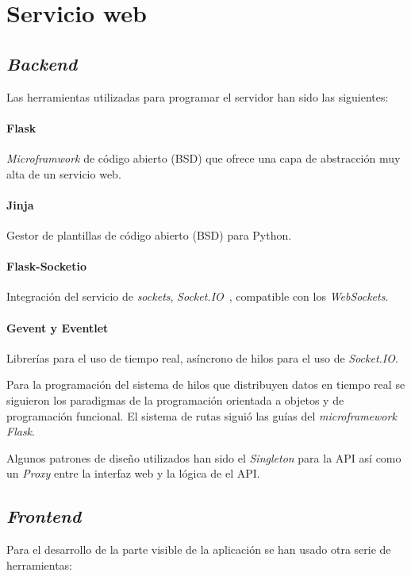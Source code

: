 \section{Servicio web}

\subsection{\textit{Backend}}

Las herramientas utilizadas para programar el servidor han sido las siguientes:
\paragraph{Flask~\cite{tool:flask}}\textit{Microframwork} de código abierto (BSD) que ofrece una capa de abstracción muy alta de un servicio web.
\paragraph{Jinja~\cite{tool:jinja}}Gestor de plantillas de código abierto (BSD) para Python.
\paragraph{Flask-Socketio~\cite{tool:flask-socketio}}Integración del servicio de \textit{sockets}, \textit{Socket.IO}~\cite{tool:socketio}, compatible con los \textit{WebSockets}.
\paragraph{Gevent y Eventlet~\cite{tool:eventlet, tool:gevent}}Librerías para el uso de tiempo real, asíncrono de hilos para el uso de \textit{Socket.IO}. 

Para la programación del sistema de hilos que distribuyen datos en tiempo real se siguieron los paradigmas de la programación orientada a objetos y de programación funcional. El sistema de rutas siguió las guías del \textit{microframework Flask}. 

Algunos patrones de diseño utilizados han sido el \textit{Singleton} para la API así como un \textit{Proxy} entre la interfaz web y la lógica de el API.

\subsection{\textit{Frontend}}

Para el desarrollo de la parte visible de la aplicación se han usado otra serie de herramientas:
